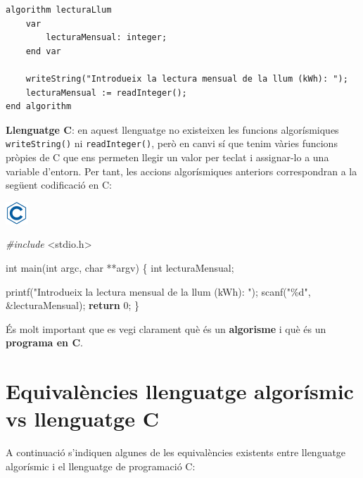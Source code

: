 \documentclass[
]{book}
\newenvironment{Shaded}{\begin{snugshade}}{\end{snugshade}}
\newcommand{\ControlFlowTok}[1]{\textcolor[rgb]{0.13,0.29,0.53}{\textbf{#1}}}
\newcommand{\DataTypeTok}[1]{\textcolor[rgb]{0.13,0.29,0.53}{#1}}
\newcommand{\DecValTok}[1]{\textcolor[rgb]{0.00,0.00,0.81}{#1}}
\newcommand{\ImportTok}[1]{#1}
\newcommand{\NormalTok}[1]{#1}
\newcommand{\PreprocessorTok}[1]{\textcolor[rgb]{0.56,0.35,0.01}{\textit{#1}}}
\newcommand{\StringTok}[1]{\textcolor[rgb]{0.31,0.60,0.02}{#1}}
\begin{document}
\begin{verbatim}
algorithm lecturaLlum
    var
        lecturaMensual: integer;
    end var

    writeString("Introdueix la lectura mensual de la llum (kWh): ");
    lecturaMensual := readInteger();
end algorithm
\end{verbatim}

\textbf{Llenguatge C}: en aquest llenguatge no existeixen les funcions algorísmiques \texttt{writeString()} ni \texttt{readInteger()}, però en canvi sí que tenim vàries funcions pròpies de C que ens permeten llegir un valor per teclat i assignar-lo a una variable d'entorn. Per tant, les accions algorísmiques anteriors correspondran a la següent codificació en C:

\includegraphics{./img/c.png}

\begin{Shaded}
\begin{Highlighting}[]
\PreprocessorTok{\#include }\ImportTok{\textless{}stdio.h\textgreater{}}

\DataTypeTok{int}\NormalTok{ main(}\DataTypeTok{int}\NormalTok{ argc, }\DataTypeTok{char}\NormalTok{ **argv) \{ }
    \DataTypeTok{int}\NormalTok{ lecturaMensual;}

\NormalTok{    printf(}\StringTok{"Introdueix la lectura mensual de la llum (kWh): "}\NormalTok{);}
\NormalTok{    scanf(}\StringTok{"\%d"}\NormalTok{, \&lecturaMensual);}
    \ControlFlowTok{return} \DecValTok{0}\NormalTok{;}
\NormalTok{\}}
\end{Highlighting}
\end{Shaded}

És molt important que es vegi clarament què és un \textbf{algorisme} i què és un \textbf{programa en C}.

\hypertarget{equivaluxe8ncies-llenguatge-algoruxedsmic-vs-llenguatge-c}{%
\section{Equivalències llenguatge algorísmic vs llenguatge C}\label{equivaluxe8ncies-llenguatge-algoruxedsmic-vs-llenguatge-c}}

A continuació s'indiquen algunes de les equivalències existents entre llenguatge algorísmic i el llenguatge de programació C:
\end{document}
